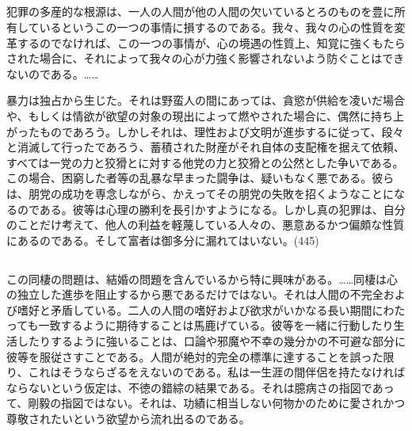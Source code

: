 \subsection{}

犯罪の多産的な根源は、一人の人間が他の人間の欠いているとろのものを豊に所有しているというこの一つの事情に損するのである。我々、我々の心の性質を変革するのでなければ、この一つの事情が、心の境遇の性質上、知覚に強くもたらされた場合に、それによって我々の心が力強く影響されないよう防ぐことはできないのである。……


暴力は独占から生じた。それは野蛮人の間にあっては、貪慾が供給を凌いだ場合や、もしくは情欲が欲望の対象の現出によって燃やされた場合に、偶然に持ち上がったものであろう。しかしそれは、理性および文明が進歩するに従って、段々と消滅して行ったであろう、蓄積された財産がそれ自体の支配権を据えて依頼、すべては一党の力と狡猾とに対する他党の力と狡猾との公然とした争いである。この場合、困窮した者等の乱暴な早まった闘争は、疑いもなく悪である。彼らは、朋党の成功を専念しながら、かえってその朋党の失敗を招くようなことになるのである。彼等は心理の勝利を長引かすようになる。しかし真の犯罪は、自分のことだけ考えて、他人の利益を軽蔑している人々の、悪意あるかつ偏頗な性質にあるのである。そして富者は御多分に漏れてはいない。(445)


\subsection{}



この同棲の問題は、結婚の問題を含んでいるから特に興味がある。……同棲は心の独立した進歩を阻止するから悪であるだけではない。それは人間の不完全および嗜好と矛盾している。二人の人間の嗜好および欲求がいかなる長い期間にわたっても一致するように期待することは馬鹿げている。彼等を一緒に行動したり生活したりするように強いることは、口論や邪魔や不幸の幾分かの不可避な部分に彼等を服従さすことである。人間が絶対的完全の標準に達することを誤った限り、これはそうならざるをえないのである。私は一生涯の間伴侶を持たなければならないという仮定は、不徳の錯綜の結果である。それは臆病さの指図であって、剛毅の指図ではない。それは、功績に相当しない何物かのために愛されかつ尊敬されたいという欲望から流れ出るのである。

